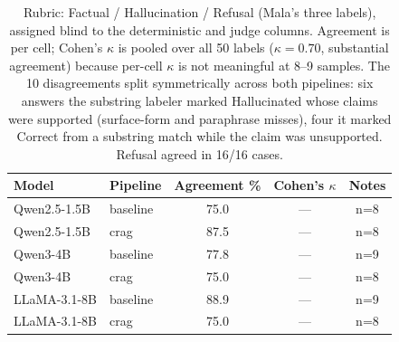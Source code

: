 
\begin{table}[h]
\centering
\caption{Human--deterministic agreement on 50 stratified labels
(8--9 per cell).}
\label{tab:human}
\begin{tabular}{llccc}
\toprule
\textbf{Model} & \textbf{Pipeline} & \textbf{Agreement \%} & \textbf{Cohen's $\kappa$} & \textbf{Notes} \\
\midrule
Qwen2.5-1.5B & baseline & 75.0 & --- & n=8 \\
Qwen2.5-1.5B & crag & 87.5 & --- & n=8 \\
Qwen3-4B & baseline & 77.8 & --- & n=9 \\
Qwen3-4B & crag & 75.0 & --- & n=8 \\
LLaMA-3.1-8B & baseline & 88.9 & --- & n=9 \\
LLaMA-3.1-8B & crag & 75.0 & --- & n=8 \\
\bottomrule
\end{tabular}

\caption*{Rubric: Factual / Hallucination / Refusal (Mala's three labels),
assigned blind to the deterministic and judge columns. Agreement is per cell;
Cohen's $\kappa$ is pooled over all 50 labels ($\kappa = 0.70$, substantial
agreement) because per-cell $\kappa$ is not meaningful at 8--9 samples. The 10
disagreements split symmetrically across both pipelines: six answers the
substring labeler marked Hallucinated whose claims were supported (surface-form
and paraphrase misses), four it marked Correct from a substring match while the
claim was unsupported. Refusal agreed in 16/16 cases.}
\end{table}
